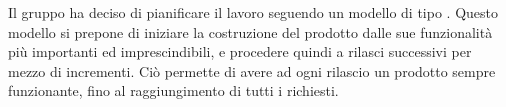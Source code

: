 Il gruppo \Gruppo{} ha deciso di pianificare il lavoro seguendo un modello di tipo \textbf {}. Questo modello si prepone di iniziare la costruzione del prodotto dalle sue funzionalità più importanti ed imprescindibili, e procedere quindi a rilasci successivi per mezzo di incrementi. Ciò permette di avere ad ogni rilascio un prodotto sempre funzionante, fino al raggiungimento di tutti i  richiesti.
